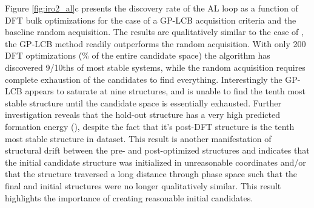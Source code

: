 %
Figure \ref{fig:iro2_al}c presents the discovery rate of the AL loop as a function of DFT bulk optimizations for the case of a GP-LCB acquisition criteria and the baseline random acquisition.
%
The results are qualitatively similar to the case of \IrOthree,
the GP-LCB method readily outperforms the random acquisition.
%
With only \num{200} DFT optimizations (\% of the entire candidate space) the algorithm has discovered \num{9/10}ths of most stable systems,
while the random acquisition requires complete exhaustion of the candidates to find everything.
%
Interestingly the GP-LCB appears to saturate at nine structures, and is unable to find the tenth most stable structure until the candidate space is essentially exhausted.
%
Further investigation reveals that the hold-out structure has a very high predicted formation energy (\DHf),
despite the fact that it's post-DFT structure is the tenth most stable structure in dataset.
%
This result is another manifestation of structural drift between the pre- and post-optimized structures and indicates that the initial candidate structure was initialized in unreasonable coordinates and/or that the structure traversed a long distance through phase space such that the final and initial structures were no longer qualitatively similar.
%
This result highlights the importance of creating reasonable initial candidates.



